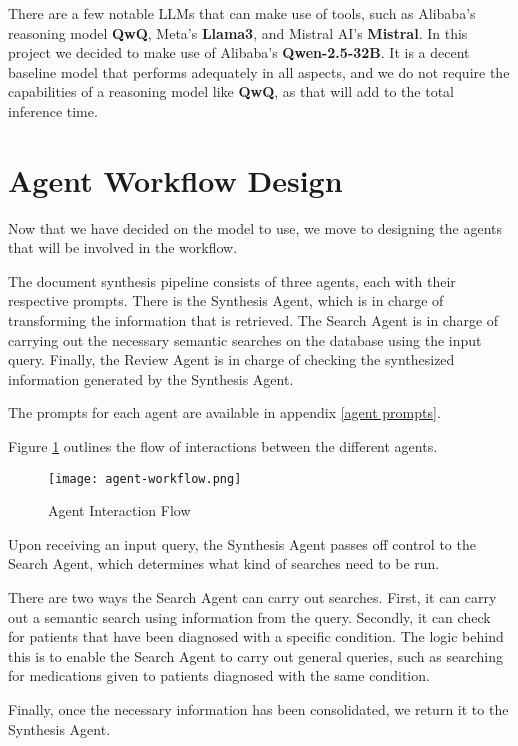 There are a few notable LLMs that can make use of tools, such as Alibaba's reasoning model \textbf{QwQ}, Meta's \textbf{Llama3}, and Mistral AI's \textbf{Mistral}. In this project we decided to make use of Alibaba's \textbf{Qwen-2.5-32B}. It is a decent baseline model that performs adequately in all aspects, and we do not require the capabilities of a reasoning model like \textbf{QwQ}, as that will add to the total inference time.

\section{Agent Workflow Design}

Now that we have decided on the model to use, we move to designing the agents that will be involved in the workflow.

The document synthesis pipeline consists of three agents, each with their respective prompts.
There is the Synthesis Agent, which is in charge of transforming the information that is retrieved. The Search Agent is in charge of carrying out the necessary semantic searches on the database using the input query. Finally, the Review Agent is in charge of checking the synthesized information generated by the Synthesis Agent.

The prompts for each agent are available in appendix \ref{agent prompts}.

Figure \ref{fig:AgentInteraction} outlines the flow of interactions between the different agents.

\begin{figure}
	\centering
	\texttt{[image: agent-workflow.png]}
	\caption{Agent Interaction Flow}
	\label{fig:AgentInteraction}
\end{figure}

Upon receiving an input query, the Synthesis Agent passes off control to the Search Agent, which determines what kind of searches need to be run.

There are two ways the Search Agent can carry out searches. First, it can carry out a semantic search using information from the query. Secondly, it can check for patients that have been diagnosed with a specific condition. The logic behind this is to enable the Search Agent to carry out general queries, such as searching for medications given to patients diagnosed with the same condition.

Finally, once the necessary information has been consolidated, we return it to the Synthesis Agent.

